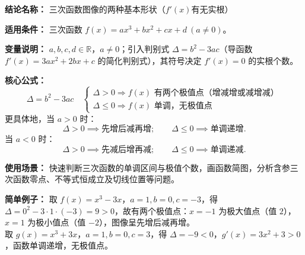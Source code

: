 \textbf{结论名称：} 三次函数图像的两种基本形状（\(f'(x)\)有无实根）

\textbf{适用条件：} 三次函数 \(f(x)=ax^{3}+bx^{2}+cx+d\ (a\neq 0)\)。

\textbf{变量说明：} \(a,b,c,d\in\mathbb{R}\)，\(a\neq0\)；引入判别式 \(\Delta = b^{2}-3ac\)（导函数 \(f'(x)=3ax^{2}+2bx+c\) 的简化判别式），其符号决定 \(f'(x)=0\) 的实根个数。

\textbf{核心公式：}
\[
\boxed{\Delta = b^{2}-3ac\quad
\begin{cases}
\Delta >0 \Rightarrow f(x)\text{ 有两个极值点（增减增或减增减）}\\[2pt]
\Delta \le 0 \Rightarrow f(x)\text{ 单调，无极值点}
\end{cases}}
\]
更具体地，当 \(a>0\) 时：
\[
\Delta>0 \implies \text{先增后减再增};\qquad \Delta\le 0 \implies \text{单调递增}.
\]
当 \(a<0\) 时：
\[
\Delta>0 \implies \text{先减后增再减};\qquad \Delta\le 0 \implies \text{单调递减}.
\]

\textbf{使用场景：} 快速判断三次函数的单调区间与极值个数，画函数简图，分析含参三次函数零点、不等式恒成立及切线位置等问题。

\textbf{简单例子：} 
取 \(f(x)=x^{3}-3x\)，\(a=1,b=0,c=-3\)，得 \(\Delta =0^{2}-3\cdot1\cdot(-3)=9>0\)，故有两个极值点：\(x=-1\) 为极大值点（值 \(2\)），\(x=1\) 为极小值点（值 \(-2\)），图像呈先增后减再增。\\
取 \(g(x)=x^{3}+3x\)，\(a=1,b=0,c=3\)，得 \(\Delta = -9<0\)，\(g'(x)=3x^{2}+3>0\)，函数单调递增，无极值点。
